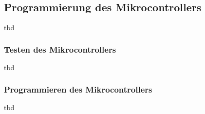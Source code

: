 \subsection{Programmierung des Mikrocontrollers}
tbd


\subsubsection*{Testen des Mikrocontrollers} 
tbd

\subsubsection*{Programmieren des Mikrocontrollers}
tbd